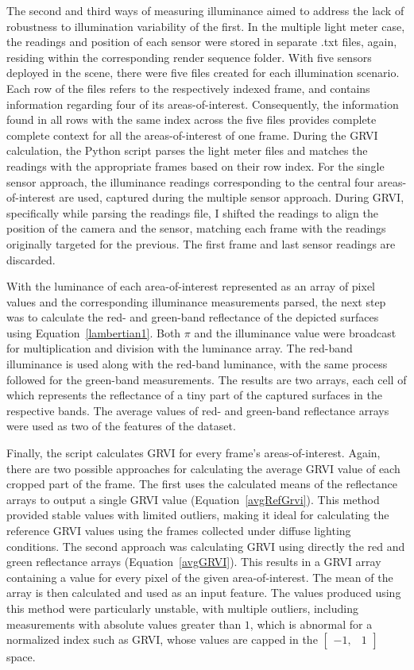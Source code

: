 The second and third ways of measuring illuminance aimed to address the lack of robustness to illumination variability of the first. In the multiple light meter case, the readings and position of each sensor were stored in separate .txt files, again, residing within the corresponding render sequence folder. With five sensors deployed in the scene, there were five files created for each illumination scenario. Each row of the files refers to the respectively indexed frame, and contains information regarding four of its areas-of-interest. Consequently, the information found in all rows with the same index across the five files provides complete complete context for all the areas-of-interest of one frame. During the GRVI calculation, the Python script parses the light meter files and matches the readings with the appropriate frames based on their row index. For the single sensor approach, the illuminance readings corresponding to the central four areas-of-interest are used, captured during the multiple sensor approach. During GRVI, specifically while parsing the readings file, I shifted the readings to align the position of the camera and the sensor, matching each frame with the readings originally targeted for the previous.  The first frame and last sensor readings are discarded.

With the luminance of each area-of-interest represented as an array of pixel values and the corresponding illuminance measurements parsed, the next step was to calculate the red- and green-band reflectance of the depicted surfaces using Equation~\ref{lambertian1}. Both $\pi$ and the illuminance value were broadcast for multiplication and division with the luminance array. The red-band illuminance is used along with the red-band luminance, with the same process followed for the green-band measurements. The results are two arrays, each cell of which represents the reflectance of a tiny part of the captured surfaces in the respective bands. The average values of red- and green-band reflectance arrays were used as two of the features of the dataset.

Finally, the script calculates GRVI for every frame's areas-of-interest. Again, there are two possible approaches for calculating the average GRVI value of each cropped part of the frame. The first uses the calculated means of the reflectance arrays to output a single GRVI value (Equation~\ref{avgRefGrvi}). This method provided stable values with limited outliers, making it ideal for calculating the reference GRVI values using the frames collected under diffuse lighting conditions. The second approach was calculating GRVI using directly the red and green reflectance arrays (Equation~\ref{avgGRVI}). This results in a GRVI array containing a value for every pixel of the given area-of-interest. The mean of the array is then calculated and used as an input feature. The values produced using this method were particularly unstable, with multiple outliers, including measurements with absolute values greater than $1$, which is abnormal for a normalized index such as GRVI, whose values are capped in the $\begin{bmatrix}
    -1, & 1
\end{bmatrix}$ space. 

